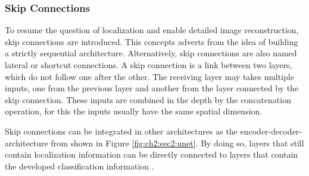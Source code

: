 \subsubsection{Skip Connections} \label{ord:ch2:sec2:subsec_arch:skipconnections}

To resume the question of localization and enable detailed image reconstruction, skip connections are introduced. 
This concepts adverts from the idea of building a strictly sequential architecture.
Alternatively, skip connections are also named lateral or shortcut connections.
A skip connection is a link between two layers, which do not follow one after the other. 
The receiving layer may takes multiple inputs, one from the previous layer and another from the layer connected by the skip connection.
These inputs are combined in the depth by the concatenation operation, for this the inputs usually have the same spatial dimension.

Skip connections can be integrated in other architectures as \eg the encoder-decoder-architecture from \cite{RF15-U-Net} shown in Figure \ref{fig:ch2:sec2:unet}.
By doing so, layers that still contain localization information can be directly connected to layers that contain the developed classification information \cite{LSD15-FCN}.

